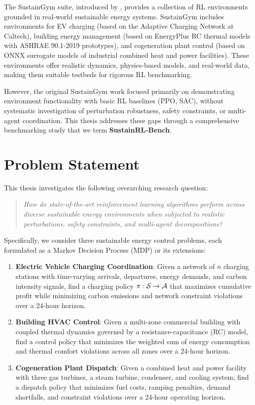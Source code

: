 The SustainGym suite, introduced by \citet{yeh2023sustaingym}, provides a collection of RL environments grounded in real-world sustainable energy systems. SustainGym includes environments for EV charging (based on the Adaptive Charging Network at Caltech), building energy management (based on EnergyPlus RC thermal models with ASHRAE 90.1-2019 prototypes), and cogeneration plant control (based on ONNX surrogate models of industrial combined heat and power facilities). These environments offer realistic dynamics, physics-based models, and real-world data, making them suitable testbeds for rigorous RL benchmarking.

However, the original SustainGym work focused primarily on demonstrating environment functionality with basic RL baselines (PPO, SAC), without systematic investigation of perturbation robustness, safety constraints, or multi-agent coordination. This thesis addresses these gaps through a comprehensive benchmarking study that we term \textbf{SustainRL-Bench}.

\section{Problem Statement}
\label{sec:problem}

This thesis investigates the following overarching research question:

\begin{quote}
\textit{How do state-of-the-art reinforcement learning algorithms perform across diverse sustainable energy environments when subjected to realistic perturbations, safety constraints, and multi-agent decompositions?}
\end{quote}

Specifically, we consider three sustainable energy control problems, each formulated as a Markov Decision Process (MDP) or its extensions:

\begin{enumerate}
    \item \textbf{Electric Vehicle Charging Coordination}: Given a network of $n$ charging stations with time-varying arrivals, departures, energy demands, and carbon intensity signals, find a charging policy $\pi: \mathcal{S} \to \mathcal{A}$ that maximizes cumulative profit while minimizing carbon emissions and network constraint violations over a 24-hour horizon.

    \item \textbf{Building HVAC Control}: Given a multi-zone commercial building with coupled thermal dynamics governed by a resistance-capacitance (RC) model, find a control policy that minimizes the weighted sum of energy consumption and thermal comfort violations across all zones over a 24-hour horizon.

    \item \textbf{Cogeneration Plant Dispatch}: Given a combined heat and power facility with three gas turbines, a steam turbine, condenser, and cooling system, find a dispatch policy that minimizes fuel costs, ramping penalties, demand shortfalls, and constraint violations over a 24-hour operating horizon.
\end{enumerate}

